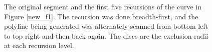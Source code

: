 \documentclass[12pt]{article}
\begin{document}
\begin{figure}[h!]
\begin{center}
  \parbox{110mm}{\caption{\label{sequence} The original segment and the first five
  recursions of the curve in Figure \ref{new_f1}.  The recursion was
  done breadth-first, and the polyline being generated was alternately
  scanned from bottom left to top right and then back again. The discs are
  the exclusion radii at each recursion level.}}
\end{center}
\end{figure}
\end{document}
